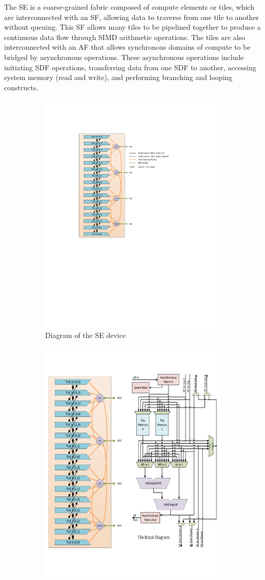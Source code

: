 The SE is a coarse-grained fabric composed of compute elements or tiles, which are interconnected with an SF, allowing data to traverse from one tile to another without queuing.
This SF allows many tiles to be pipelined together to produce a continuous data flow through SIMD arithmetic operations.
The tiles are also interconnected with an AF that allows synchronous domains of compute to be bridged by asynchronous operations.
These asynchronous operations include initiating SDF operations, transferring data from one SDF to another, accessing system memory (read and write), and performing branching and looping constructs.

\begin{figure} [h]
  \begin{subfigure}{.5\textwidth}
    \centering
    \includegraphics[trim=118 310 180 110, clip, width=0.7\linewidth]{fig/se_device.pdf}
    \caption{Diagram of the SE device}
    \label{fig:sub-se}
    \end{subfigure}
  \begin{subfigure}{.5\textwidth}
  \centering
  \includegraphics[trim=275 100 8 50, clip, width=0.5\linewidth]{fig/se_device_tile.pdf}

\end{subfigure}
\end{figure}
